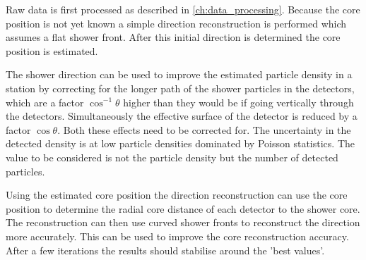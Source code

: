 Raw data is first processed as described in \cref{ch:data_processing}. Because the core position is not yet known a simple direction reconstruction is performed which assumes a flat shower front. After this initial direction is determined the core position is estimated.

The shower direction can be used to improve the estimated particle density in a station by correcting for the longer path of the shower particles in the detectors, which are a factor $\cos^{-1} \theta$ higher than they would be if going vertically through the detectors. Simultaneously the effective surface of the detector is reduced by a factor $\cos \theta$. Both these effects need to be corrected for. The uncertainty in the detected density is at low particle densities dominated by Poisson statistics. The value to be considered is not the particle density but the number of detected particles. %

Using the estimated core position the direction reconstruction can use the core position to determine the radial core distance of each detector to the shower core. The reconstruction can then use curved shower fronts to reconstruct the direction more accurately. This can be used to improve the core reconstruction accuracy. After a few iterations the results should stabilise around the 'best values'.
